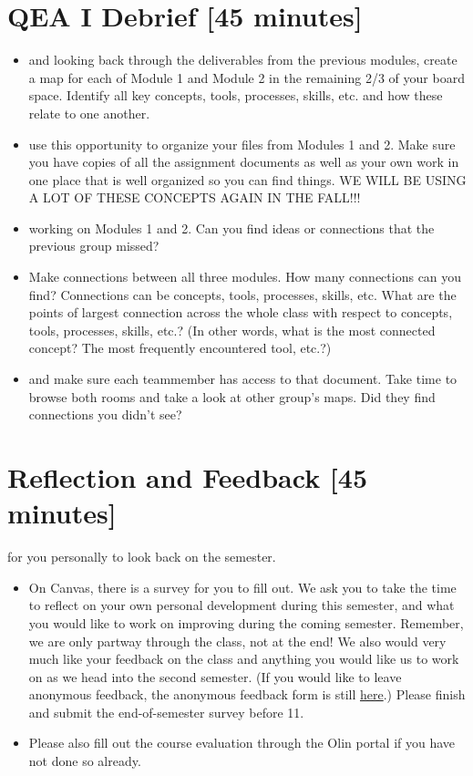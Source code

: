 \documentclass{tufte-handout}
\begin{document}
\section{QEA I Debrief [45 minutes]}
\begin{itemize}
\item {} and looking back through the deliverables from the previous modules, create a map for each of Module 1 and Module 2 in the remaining 2/3 of your board space.  Identify all key concepts, tools, processes, skills, etc. and how these relate to one another.
\item {} use this opportunity to organize your files from Modules 1 and 2.  Make sure you have copies of all the assignment documents as well as your own work in one place that is well organized so you can find things.  WE WILL BE USING A LOT OF THESE CONCEPTS AGAIN IN THE FALL!!!
\item {} working on Modules 1 and 2.  Can you find ideas or connections that the previous group missed?
\item {} Make connections between all three modules.  How many connections can you find?  Connections can be concepts, tools, processes, skills, etc. What are the points of largest connection across the whole class with respect to concepts, tools, processes, skills, etc.?  (In other words, what is the most connected concept?  The most frequently encountered tool, etc.?)
\item {} and make sure each teammember has access to that document.  Take time to browse both rooms and take a look at other group's maps.  Did they find connections you didn't see?
\end{itemize}


\section{Reflection and Feedback [45 minutes]}

 for you personally to look back on the semester.

\begin{itemize}
\item On Canvas, there is a survey for you to fill out.  We ask you to take the time to reflect on your own personal development during this semester, and what you would like to work on improving during the coming semester.  Remember, we are only partway through the class, not at the end!  We also would very much like your feedback on the class and anything you would like us to work on as we head into the second semester. (If you would like to leave anonymous feedback, the anonymous feedback form is still \href{https://docs.google.com/forms/d/e/1FAIpQLSefl9-C9qsvMEPz8al1eZWOV5sD7Gqfmmyzy-zn87bWm1-jvQ/viewform}{here}.)  Please finish and submit the end-of-semester survey before 11. 
\item Please also fill out the course evaluation through the Olin portal if you have not done so already.
\end{itemize}

\end{document}
